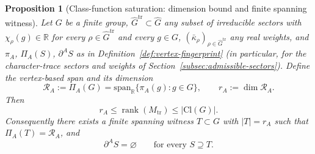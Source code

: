 \documentclass[11pt,a4paper]{article}
\theoremstyle{plain}
\newtheorem{proposition}[theorem]{Proposition}
\theoremstyle{definition}
\theoremstyle{remark}
\newcommand{\R}{\mathbb{R}}
\newcommand{\Cl}{\mathrm{Cl}}
\newcommand{\rank}{\operatorname{rank}}
\newcommand{\adm}{\mathrm{tr}}
\newcommand{\Gadm}{\widehat{G}^{\adm}}
\newcommand{\Madm}{M_{\adm}}
\newcommand{\PiA}{\Pi_A}
\newcommand{\dA}{\partial^A}
\newcommand{\kap}{\bar\kappa_\rho}
\newcommand{\piA}{\pi_A}
\begin{document}
      \begin{proposition}[Class-function saturation: dimension bound and finite spanning witness]
        \label{prop:vertex-admissible-saturation}
        Let $G$ be a finite group, $\Gadm \subset \widehat G$ any subset of irreducible sectors with
        $\chi_\rho(g) \in \R$ for every $\rho \in \Gadm$ and every $g \in G$,
        $(\kap)_{\rho \in \Gadm}$ any real weights, and $\piA$, $\PiA(S)$, $\dA S$
        as in Definition~\ref{def:vertex-fingerprint} (in particular, for the character-trace
        sectors and weights of Section~\ref{subsec:admissible-sectors}).
        Define the vertex-based span and its dimension
        \begin{equation}
          \label{eq:RA-def}
          \mathcal{R}_A := \PiA(G) = \mathrm{span}_\R\{\piA(g) : g \in G\},
          \qquad
          r_A := \dim \mathcal{R}_A.
        \end{equation}
        Then
        \begin{equation}
          \label{eq:rank-bound}
          r_A \le \rank(\Madm) \le |\Cl(G)|.
        \end{equation}
        Consequently there exists a finite spanning witness $T \subset G$ with $|T| = r_A$ such that
        $\PiA(T) = \mathcal{R}_A$, and
        \begin{equation}
          \label{eq:frontier-empty}
          \dA S = \varnothing
          \qquad \text{for every } S \supseteq T.
        \end{equation}
      \end{proposition}
\end{document}
